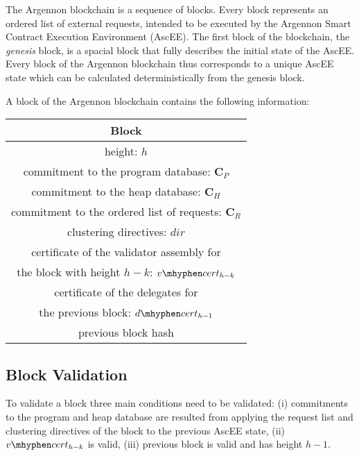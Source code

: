 
The Argennon blockchain is a sequence of blocks. Every block represents an ordered list of external requests, intended
to be executed by the Argennon Smart Contract Execution Environment (AscEE). The first block of the blockchain, the
\emph{genesis} block, is a spacial block that fully describes the initial state of the AscEE. Every block of the
Argennon blockchain thus corresponds to a unique AscEE state which can be calculated deterministically from the genesis
block.

A block of the Argennon blockchain contains the following information:

\begin{center}
    \begin{tabular}{||c||}
        \hline
        \textbf{Block} \\ [0.6ex]
        \hline\hline
        height: $h$                          \\ [1.2ex]
        commitment to the program database: $\mathbf{C}_{P}$             \\ [1.2ex]
        commitment to the heap database: $\mathbf{C}_{H}$               \\ [1.2ex]
        commitment to the ordered list of requests: $\mathbf{C}_{R}$        \\ [1.2ex]
        clustering directives: $dir$                        \\ [1.2ex]
        certificate of the validator assembly for \\
        the block with height $h - k$: $v \mhyphen cert_{h-k}$         \\ [1.2ex]
        certificate of the delegates for\\
        the previous block: $d \mhyphen cert_{h-1}$        \\ [1.2ex]
        previous block hash                           \\ [1.2ex]
        \hline
    \end{tabular}
\end{center}

\subsection{Block Validation}\label{subsec:block-validation}

To validate a block three main conditions need to be validated: (i) commitments to the program and heap
database are resulted from applying the request list and clustering directives of the block to the previous AscEE
state, (ii) $v \mhyphen cert_{h-k}$ is valid, (iii) previous block is valid and has height $h - 1$.

